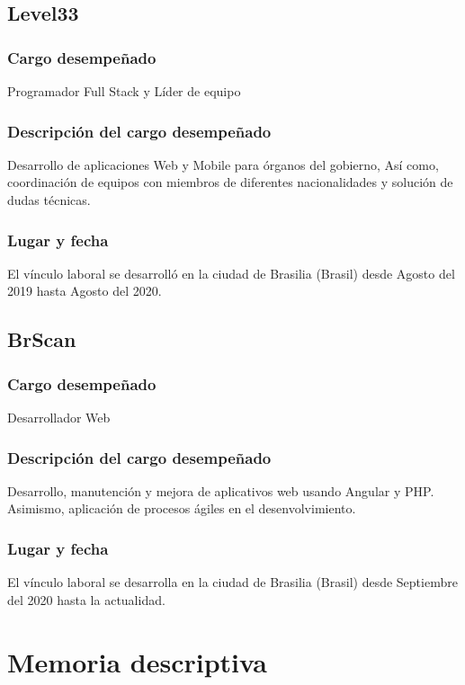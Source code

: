 \section{Level33}

\subsection{Cargo desempeñado}
Programador Full Stack y Líder de equipo

\subsection{Descripción del cargo desempeñado}
Desarrollo de aplicaciones Web y Mobile para órganos del gobierno, Así como, coordinación de equipos con miembros de diferentes nacionalidades y solución de dudas técnicas.

\subsection{Lugar y fecha}
El vínculo laboral se desarrolló en la ciudad de Brasilia (Brasil) desde Agosto del 2019 hasta Agosto del 2020.

\section{BrScan}

\subsection{Cargo desempeñado}
Desarrollador Web

\subsection{Descripción del cargo desempeñado}
Desarrollo, manutención y mejora de aplicativos web usando Angular y PHP. Asimismo, aplicación de procesos ágiles en el desenvolvimiento.

\subsection{Lugar y fecha}
El vínculo laboral se desarrolla en la ciudad de Brasilia (Brasil) desde Septiembre del 2020 hasta la actualidad.


\chapter{Memoria descriptiva}

